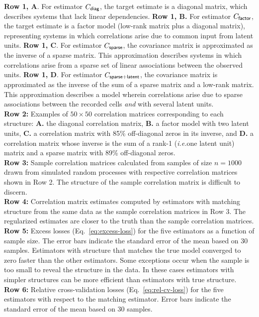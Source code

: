 \documentclass[10pt]{article}
\newcommand{\ie}{\emph{i.e.}\;}
\begin{document}
\begin{FPfigure}
{        {\bf Row 1, A}.  For estimator $C_{\sf diag}$, the target estimate is a diagonal matrix, which describes systems that lack linear dependencies. 
        {\bf  Row 1, B.} For estimator $C_{\sf factor}$, the target estimate is a factor model (low-rank matrix plus a diagonal matrix), representing systems in which correlations arise due to common input from latent units. 
        {\bf  Row 1, C}. For estimator $C_{\sf sparse}$, the covariance matrix is approximated as the inverse of a sparse matrix. This approximation describes systems in which correlations arise from a sparse set of  linear associations between the observed units. 
        {\bf  Row 1, D}.  For estimator $C_{\sf sparse+latent}$, the covariance matrix is approximated as the inverse of the sum of a sparse matrix and a low-rank matrix. This approximation describes a model wherein correlations arise due to sparse associations between the recorded cells \emph{and} with several latent units. \\
{\bf Row 2:} Examples of $50\times 50$ correlation matrices corresponding to each structure: {\bf A.} the diagonal correlation matrix, {\bf B.} a factor model with two latent units, {\bf C.}  a correlation matrix with 85\%  off-diagonal zeros in its inverse, and {\bf  D.} a correlation matrix whose inverse is the sum of a rank-1 (\ie one latent unit) matrix and a sparse matrix with 89\% off-diagonal zeros. 
\\
{\bf Row 3:} Sample correlation matrices calculated from samples of size $n=1000$ drawn from simulated random processes with respective correlation matrices shown in Row 2.  The structure of the sample correlation matrix is difficult to discern.
\\
{\bf Row 4:} Correlation matrix estimates computed by estimators with matching structure from the same data as the sample correlation matrices in Row 3. The regularized estimates are closer to the truth than the sample correlation matrices.
\\
{\bf Row 5:} Excess losses (Eq.~\ref{eq:excess-loss}) for the five estimators as a function of sample size. The error bars indicate the standard error of the mean based on 30 samples.  Estimators with structure that matches the true model converged to zero faster than the other estimators. Some exceptions occur when the sample is too small to reveal the structure in the data. In these cases estimators with simpler structures can be more efficient than estimators with true structure.
\\
{\bf Row 6:} Relative cross-validation losses (Eq.~\ref{eq:rel-cv-loss}) for the five estimators with respect to the matching estimator. Error bars indicate the standard error of the mean based on 30 samples.
    }
    \label{fig:1}
\end{FPfigure} 
\end{document}
